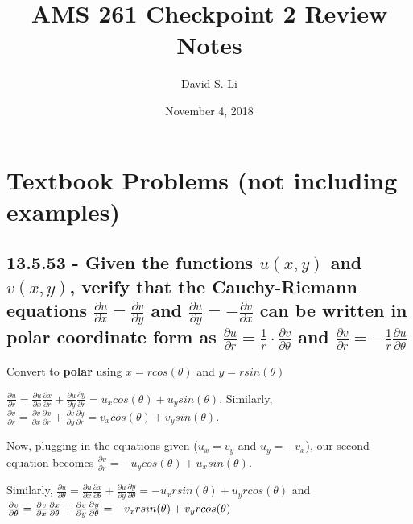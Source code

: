 \documentclass{article}
\title{AMS 261 Checkpoint 2 Review Notes}
\author{David S. Li}
\date{November 4, 2018}
\begin{document}
\maketitle

\section{Textbook Problems (not including examples)}
\subsection{13.5.53 - Given the functions $u(x, y)$ and $v(x, y)$, verify that the Cauchy-Riemann equations $\frac{\partial u}{\partial x} = \frac{\partial v}{\partial y}$ and $\frac{\partial u}{\partial y} = -\frac{\partial v}{\partial x}$ can be written in polar coordinate form as $\frac{\partial u}{\partial r} = \frac{1}{r} \cdot \frac{\partial v}{\partial\theta}$ and $\frac{\partial v}{\partial r} = -\frac{1}{r}\frac{\partial u}{\partial\theta}$}

\par\noindent\large Convert to \textbf{polar} using $x = rcos(\theta)$ and $y = rsin(\theta)$ 
\par\noindent\Large $\frac{\partial u}{\partial r} = \frac{\partial u}{\partial x}\frac{\partial x}{\partial r} + \frac{\partial u}{\partial y}\frac{\partial y}{\partial r} = u_{x}cos(\theta) + u_{y}sin(\theta)$.  Similarly, $\frac{\partial v}{\partial r} = \frac{\partial v}{\partial x}\frac{\partial x}{\partial r} + \frac{\partial v}{\partial y}\frac{\partial y}{\partial r} = v_{x}cos(\theta) + v_{y}sin(\theta)$.\vspace{0.25cm}

\par\noindent\Large Now, plugging in the equations given ($u_{x} = v_{y}$ and $u_{y} = -v_{x}$), our second equation becomes $\frac{\partial v}{\partial r} = -u_{y}cos(\theta) + u_{x}sin(\theta)$.\vspace{0.25cm} %

\par\noindent\Large Similarly, $\frac{\partial u}{\partial\theta} = \frac{\partial u}{\partial x}\frac{\partial x}{\partial\theta} + \frac{\partial u}{\partial y}\frac{\partial y}{\partial\theta} = -u_{x}rsin(\theta) + u_{y}rcos(\theta)$ and $\frac{\partial v}{\partial\theta} = \frac{\partial v}{\partial x}\frac{\partial x}{\partial\theta} + \frac{\partial v}{\partial y}\frac{\partial y}{\partial\theta} =\linebreak -v_{x}rsin(\theta) + v_{y}rcos(\theta)$\vspace{0.25cm}
\end{document}
